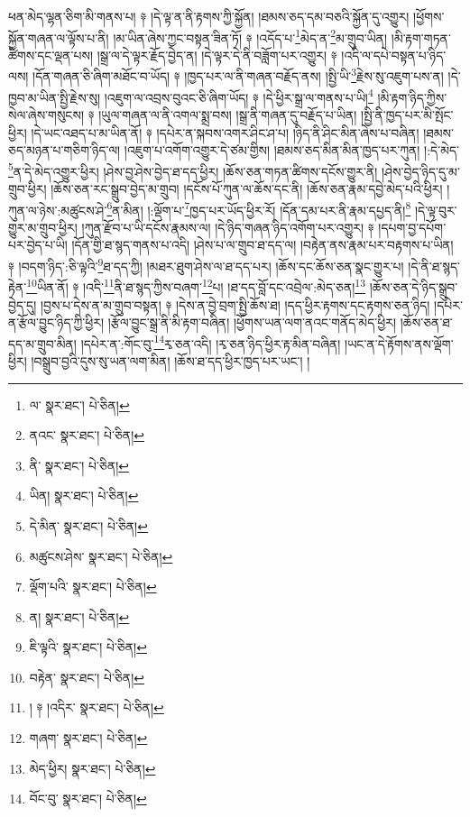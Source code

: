 ཕན་མེད་ལྷན་ཅིག་མི་གནས་པ། ༈ །དེ་ལྟ་ན་ནི་རྟགས་ཀྱི་སྐྱོན། །ཐམས་ཅད་དམ་བཅའི་སྐྱོན་དུ་འགྱུར། །ཕྱོགས་སྐྱོན་གཞན་ལ་ལྟོས་པ་ནི། །མ་ཡིན་ཞེས་ཀྱང་བསྟན་ཟིན་ཏོ། ༈ །འདོད་པ་\footnote{ལ་  སྣར་ཐང་།  པེ་ཅིན། }མེད་ན་\footnote{ནའང་  སྣར་ཐང་།  པེ་ཅིན། }མ་གྲུབ་ཡིན། །མི་རྟག་གཏན་ཚིགས་དང་ལྡན་པས། །སྒྲ་ལ་དེ་ལྟར་རྗོད་བྱེད་ན། །དེ་ལྟར་དེ་ནི་བཟློག་པར་འགྱུར། ༈ །འདི་ལ་དཔེ་བསྟན་པ་ཉིད་ལས། །དོན་གཞན་ཅི་ཞིག་མཐོང་བ་ཡོད། ༈ །ཁྱད་པར་ལ་ནི་གཞན་བརྗོད་ནས། །སྤྱི་ཡི་\footnote{ནི་  སྣར་ཐང་།  པེ་ཅིན། }རྗེས་སུ་འཇུག་པས་ན། །དེ་ཁྱབ་མ་ཡིན་སྤྱི་རྗེས་སུ། །འཇུག་ལ་འབྲས་བུའང་ཅི་ཞིག་ཡོད། ༈ །དེ་ཕྱིར་སྒྲ་ལ་གནས་པ་ཡི།\footnote{ཡིན།  སྣར་ཐང་།  པེ་ཅིན། } །མི་རྟག་ཉིད་ཀྱིས་སེལ་ཞེས་གསུངས། ༈ །ཡུལ་གཞན་ལ་ནི་འགལ་སྨྲ་བས། །སྒྲ་ནི་གཞན་དུ་བརྗོད་པ་ཡིན། །སྤྱི་ནི་ཁྱད་པར་མི་སྤོང་ཕྱིར། །དེ་ཡང་འཐད་པ་མ་ཡིན་ནོ། ༈ །དཔེར་ན་སྐབས་འགར་ཤིང་ཤ་པ། །ཉིད་ནི་ཤིང་མིན་ཞེས་པ་བཞིན། །ཐམས་ཅད་མཉན་པ་གཅིག་ཉིད་ལ། །འཇུག་པ་འགོག་འགྱུར་དེ་ཙམ་གྱིས། །ཐམས་ཅད་མིན་མིན་ཁྱད་པར་ཀུན། །:དེ་མེད་\footnote{དེ་མིན་  སྣར་ཐང་།  པེ་ཅིན། }ན་དེ་མེད་འགྱུར་ཕྱིར། །ཤེས་བྱ་ཤེས་བྱེད་ཐ་དད་ཕྱིར། །ཆོས་ཅན་གཏན་ཚིགས་དངོས་གྱུར་ནི། །ཤེས་བྱེད་ཉིད་དུ་མ་གྲུབ་ཕྱིར། །ཆོས་ཅན་རང་སྒྲུབ་བྱེད་མ་གྲུབ། །དངོས་པོ་ཀུན་ལ་ཆོས་དང་ནི། །ཆོས་ཅན་རྣམ་དབྱེ་མེད་པའི་ཕྱིར། །ཀུན་ལ་ཉེས་:མཚུངས་ཤེ་\footnote{མཚུངས་ཤེས་  སྣར་ཐང་།  པེ་ཅིན། }ན་མིན། །:ལྡོག་པ་\footnote{ལྡོག་པའི་  སྣར་ཐང་།  པེ་ཅིན། }ཁྱད་པར་ཡོད་ཕྱིར་རོ། །དོན་དམ་པར་ནི་རྣམ་དཔྱད་ནི།\footnote{ན།  སྣར་ཐང་།  པེ་ཅིན། } །དེ་ལྟ་བུར་གྱུར་མ་གྲུབ་ཕྱིར། །ཀུན་རྫོབ་པ་ཡི་དངོས་རྣམས་ལ། །དེ་ཉིད་གཞན་ཉིད་འགོག་པར་འགྱུར། ༈ །དཔག་བྱ་དཔོག་པར་བྱེད་པ་ཡི། །དོན་གྱི་ཐ་སྙད་གནས་པ་འདི། །ཤེས་པ་ལ་གྲུབ་ཐ་དད་ལ། །བརྟེན་ནས་རྣམ་པར་བརྟགས་པ་ཡིན། ༈ །བདག་ཉིད་:ཅི་ལྟའི་\footnote{ཇི་ལྟའི་  སྣར་ཐང་།  པེ་ཅིན། }ཐ་དད་ཀྱི། །མཐར་ཐུག་ཤེས་ལ་ཐ་དད་པར། །ཆོས་དང་ཆོས་ཅན་སྣང་གྱུར་པ། །དེ་ནི་ཐ་སྙད་རྟེན་\footnote{བརྟེན་  སྣར་ཐང་།  པེ་ཅིན། }ཡིན་ནོ། ༈ །འདི་\footnote{། ༈ །འདིར་  སྣར་ཐང་།  པེ་ཅིན། }ནི་ཐ་སྙད་ཀྱིས་བཞག་\footnote{གཞག་  སྣར་ཐང་།  པེ་ཅིན། }པ། །ཐ་དད་བློ་དང་འབྲེལ་:མེད་ཅན།\footnote{མེད་ཕྱིར།  སྣར་ཐང་།  པེ་ཅིན། } །ཆོས་ཅན་དེ་ཉིད་སྒྲུབ་བྱེད་དུ། །བྱས་པ་དེས་ན་མ་གྲུབ་བསྟན། ༈ །དེས་ན་བྱེ་བྲག་སྤྱི་ཆོས་ཐ། །དད་ཕྱིར་རྟགས་དང་རྟགས་ཅན་ཉིད། །དཔེར་ན་རྩོལ་བྱུང་ཉིད་ཀྱི་ཕྱིར། །རྩོལ་བྱུང་སྒྲ་ནི་མི་རྟག་བཞིན། །ཕྱོགས་ཡན་ལག་ནའང་གནོད་མེད་ཕྱིར། །ཆོས་ཅན་ཐ་དད་མ་གྲུབ་མིན། །དཔེར་ན་:གོང་བུ་\footnote{བོང་བུ་  སྣར་ཐང་།  པེ་ཅིན། }རྭ་ཅན་འདི། །རྭ་ཅན་ཉིད་ཕྱིར་རྟ་མིན་བཞིན། །ཡང་ན་དེ་རྟོགས་ནས་ལྡོག་ཕྱིར། །བསྒྲུབ་བྱའི་དུས་སུ་ཡན་ལག་མིན། །ཆོས་ཐ་དད་ཕྱིར་ཁྱད་པར་ཡང་། །
